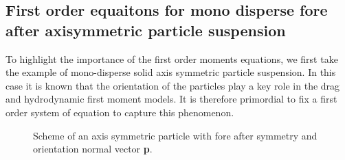 
\subsection{First order equaitons for mono disperse fore after axisymmetric particle suspension}

To highlight the importance of the first order moments equations, we first take the example of mono-disperse solid axis symmetric particle suspension. 
In this case it is known that the orientation of the particles play a key role in the drag and hydrodynamic first moment models.
It is therefore primordial to fix a first order system of equation to capture this phenomenon.  
\begin{figure}[h!]
    \centering
    \hfill
    \hfill
    \hfill
    \caption{Scheme of an axis symmetric particle with fore after symmetry and orientation normal vector \textbf{p}.}
    \label{fig:scheme2}
\end{figure}

